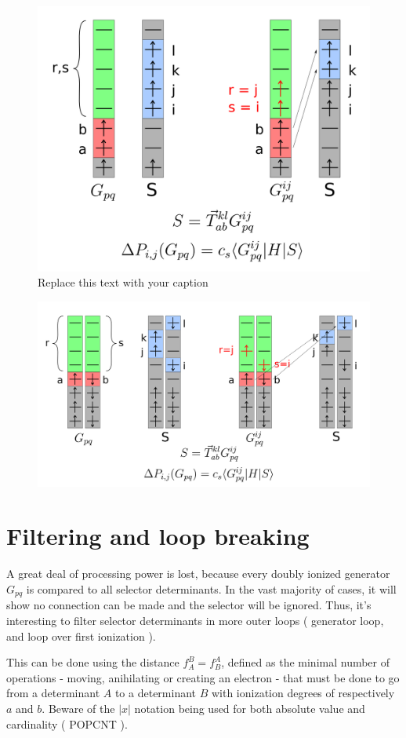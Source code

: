 \documentclass[./thesis.tex]{subfiles}
\begin{document}
\begin{figure}[h!]
	\begin{center}
		\includegraphics[width=0.70\columnwidth]{figures/cipsi/systematic_determination}
		\caption{{Replace this text with your caption%
		}}
	\end{center}
\end{figure}
\begin{figure}[h!]
	\begin{center}
		\includegraphics[width=0.70\columnwidth]{figures/cipsi/systematic_determination2}
		\caption{{\label{splash}%
		}}
	\end{center}
\end{figure}

\section{Filtering and loop breaking}
A great deal of processing power is lost, because every doubly ionized generator $G_{pq}$ is compared to all selector determinants. In the vast majority of cases, it will show no connection can be made and the selector will be ignored. Thus, it's interesting to filter selector determinants in more outer loops ( generator loop, and loop over first ionization ).

This can be done using the distance $f_A^B = f_B^A$, defined as the minimal number of operations - moving, anihilating or creating an electron - that must be done to go from a determinant $A$ to a determinant $B$ with ionization degrees of respectively $a$ and $b$. Beware of the $|x|$ notation being used for both absolute value and cardinality ( POPCNT ).
\end{document}

